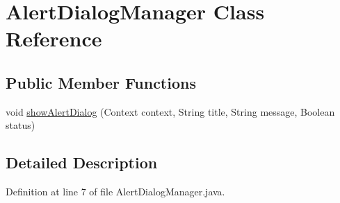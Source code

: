 \hypertarget{classcom_1_1example_1_1android_1_1apis_1_1_alert_dialog_manager}{\section{Alert\-Dialog\-Manager Class Reference}
\label{classcom_1_1example_1_1android_1_1apis_1_1_alert_dialog_manager}
}
\subsection*{Public Member Functions}
\begin{DoxyCompactItemize}
\item 
void \hyperlink{classcom_1_1example_1_1android_1_1apis_1_1_alert_dialog_manager_a41ed5e7e64309a3f3397a4d338f7d5bf}{show\-Alert\-Dialog} (Context context, String title, String message, Boolean status)
\end{DoxyCompactItemize}


\subsection{Detailed Description}


Definition at line 7 of file Alert\-Dialog\-Manager.\-java.



